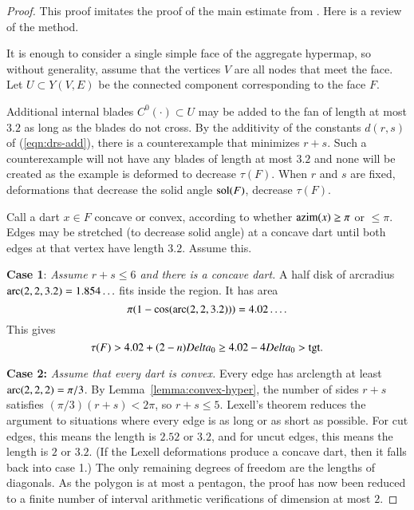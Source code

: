 \begin{proof} This proof imitates the proof of the main estimate from \cite{Hales:2006:DCG}.    Here is a review of the method.

It is enough to consider a single simple face of the aggregate hypermap, so without generality,   assume that the vertices $V$ are all nodes that meet the face.  Let $U\subset Y(V,E)$ be the connected component corresponding to the face $F$.

Additional internal blades $C^0(\cdot)\subset U$ may be added to the fan of length at most $3.2$ as long as the blades do not cross.  By the additivity of the constants $d(r,s)$ of (\ref{eqn:drs-add}), there is a counterexample that minimizes $r+s$.  Such a counterexample will not have any blades of length at most $3.2$ and none will be created as the example is deformed to decrease $\tau(F)$.  When $r$ and $s$ are fixed, deformations that decrease the solid angle $\operatorname{sol}(F)$, decrease $\tau(F)$.

Call a dart $x\in F$ concave or convex, according to whether ${\operatorname{azim}}(x)\ge\pi$ or $\le\pi$.  Edges may be stretched (to decrease solid angle) at a concave dart until both edges at that vertex have length $3.2$. Assume this.

{\bf Case 1}:
{\it Assume $r+s\le6$ and there is a concave dart.}  A half disk of arcradius $\operatorname{arc}(2,2,3.2)=1.854\ldots$ fits inside the region.  It has area
$$\pi(1-\cos(\operatorname{arc}(2,2,3.2)))=4.02\ldots.$$
This gives
$$\tau(F) > 4.02 + (2-n)Delta_0 \ge 4.02 -4 Delta_0 > {\operatorname{tgt}}.$$

{\bf Case 2:}
{\it Assume that every dart is convex.}
Every edge has arclength at least $\operatorname{arc}(2,2,2)=\pi/3$.  By Lemma~\ref{lemma:convex-hyper}, the number of sides $r+s$ satisfies $(\pi/3)(r+s) < 2\pi$, so $r+s\le5$.  Lexell's theorem reduces the argument to situations where every edge is as long or as short as possible.  For cut edges, this means the length is $2.52$ or $3.2$, and for uncut edges, this means the length is $2$ or $3.2$.  (If the Lexell deformations produce a concave dart, then it falls back into case 1.)  The only remaining degrees of freedom are the lengths of diagonals.  As the polygon is at most a pentagon, the proof has now been reduced to a finite number of interval arithmetic verifications of dimension at most $2$.


\end{proof}
